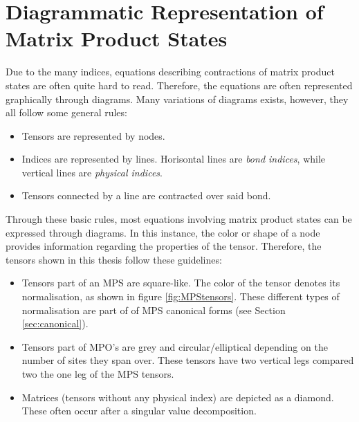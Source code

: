 \chapter{Diagrammatic Representation of Matrix Product States} \label{chap:diagrams}

Due to the many indices, equations describing contractions of matrix product states are often quite hard to read. Therefore, the equations are often represented graphically through diagrams. Many variations of diagrams exists, however, they all follow some general rules:
\begin{itemize}
\item
Tensors are represented by nodes.
\item
Indices are represented by lines. Horisontal lines are \textit{bond indices}, while vertical lines are \textit{physical indices}.
\item
Tensors connected by a line are contracted over said bond.
\end{itemize}
Through these basic rules, most equations involving matrix product states can be expressed through diagrams. In this instance, the color or shape of a node provides information regarding the properties of the tensor. Therefore, the tensors shown in this thesis follow these guidelines:
\begin{itemize}
\item
Tensors part of an MPS are square-like. The color of the tensor denotes its normalisation, as shown in figure \ref{fig:MPStensors}. These different types of normalisation are part of of MPS canonical forms (see Section \ref{sec:canonical}).
\item
Tensors part of MPO's are grey and circular/elliptical depending on the number of sites they span over. These tensors have two vertical legs compared two the one leg of the MPS tensors.
\item
Matrices (tensors without any physical index) are depicted as a diamond. These often occur after a singular value decomposition. 
\end{itemize} 


